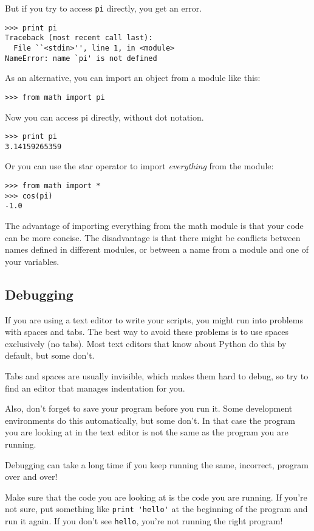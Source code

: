 \documentclass{article}
\begin{document}
But if you try to access \verb|pi| directly, you get an error.
\begin{verbatim}
>>> print pi
Traceback (most recent call last):
  File ``<stdin>'', line 1, in <module>
NameError: name `pi' is not defined
\end{verbatim}
As an alternative, you can import an object from a module like this:
\begin{verbatim}
>>> from math import pi
\end{verbatim}
Now you can access pi directly, without dot notation.
\begin{verbatim}
>>> print pi
3.14159265359
\end{verbatim}
Or you can use the star operator to import \emph{everything} from the
module:
\begin{verbatim}
>>> from math import *
>>> cos(pi)
-1.0
\end{verbatim}
The advantage of importing everything from the math module is that
your code can be more concise. The disadvantage is that there might
be conflicts between names defined in different modules, or between
a name from a module and one of your variables.

\subsection{Debugging}
If you are using a text editor to write your scripts, you might run
into problems with spaces and tabs. The best way to avoid these
problems is to use spaces exclusively (no tabs). Most text editors
that know about Python do this by default, but some don’t.

Tabs and spaces are usually invisible, which makes them hard to debug,
so try to find an editor that manages indentation for you.

Also, don’t forget to save your program before you run it. Some
development environments do this automatically, but some don’t. In
that case the program you are looking at in the text editor is not the
same as the program you are running.

Debugging can take a long time if you keep running the same,
incorrect, program over and over!

Make sure that the code you are looking at is the code you are
running. If you’re not sure, put something like \verb|print 'hello'|
at the beginning of the program and run it again. If you don't see
\verb|hello|, you're not running the right program!


\end{document}
